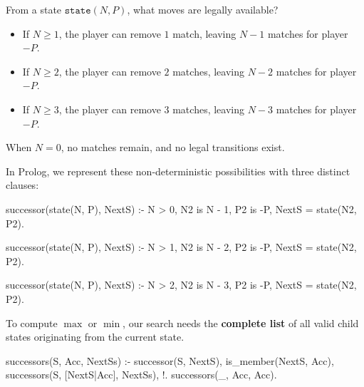 From a state $\texttt{state}(N, P)$, what moves are legally available?
\begin{itemize}
    \item If $N \ge 1$, the player can remove $1$ match, leaving $N - 1$ matches for player $-P$.
    \item If $N \ge 2$, the player can remove $2$ matches, leaving $N - 2$ matches for player $-P$.
    \item If $N \ge 3$, the player can remove $3$ matches, leaving $N - 3$ matches for player $-P$.
\end{itemize}
When $N = 0$, no matches remain, and no legal transitions exist.


In Prolog, we represent these non-deterministic possibilities with three distinct clauses:

\begin{codeblock}
successor(state(N, P), NextS) :-
    N > 0,
    N2 is N - 1,
    P2 is -P,
    NextS = state(N2, P2).

successor(state(N, P), NextS) :-
    N > 1,
    N2 is N - 2,
    P2 is -P,
    NextS = state(N2, P2).

successor(state(N, P), NextS) :-
    N > 2,
    N2 is N - 3,
    P2 is -P,
    NextS = state(N2, P2).
\end{codeblock}

To compute $\max$ or $\min$, our search needs the \textbf{complete list} of all valid child states originating from the current state.



\begin{codeblock}
successors(S, Acc, NextSs) :-
    successor(S, NextS),
    \+ is_member(NextS, Acc),
    successors(S, [NextS|Acc], NextSs),
    !.
successors(_, Acc, Acc).
\end{codeblock}

